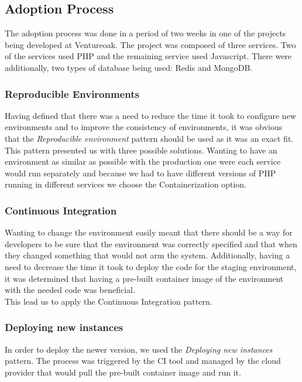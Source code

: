 			\subsection{Adoption Process}
			The adoption process was done in a period of two weeks in one of the projects being developed at Ventureoak. The project was composed of three services. Two of the services used PHP and the remaining service used Javascript. There were additionally, two types of database being used: Redis and MongoDB. \\
            \subsubsection*{Reproducible Environments}
            Having defined that there was a need to reduce the time it took to configure new environments and to improve the consistency of environments, it was obvious that the \textit{Reproducible environment} pattern should be used as it was an exact fit. \\
            This pattern presented us with three possible solutions. Wanting to have an environment as similar as possible with the production one were each service would run separately and because we had to have different versions of PHP running in different services we choose the Containerization option.
            \subsubsection*{Continuous Integration}
            Wanting to change the environment easily meant that there should be a way for developers to be sure that the environment was correctly specified and that when they changed something that would not arm the system. Additionally, having a need to decrease the time it took to deploy the code for the staging environment, it was determined that having a pre-built container image of the environment with the needed code was beneficial. \\
            This lead us to apply the Continuous Integration pattern. \\
            \subsubsection*{Deploying new instances}
            In order to deploy the newer version, we used the \textit{Deploying new instances} pattern. The process was triggered by the CI tool and managed by the cloud provider that would pull the pre-built container image and run it.

